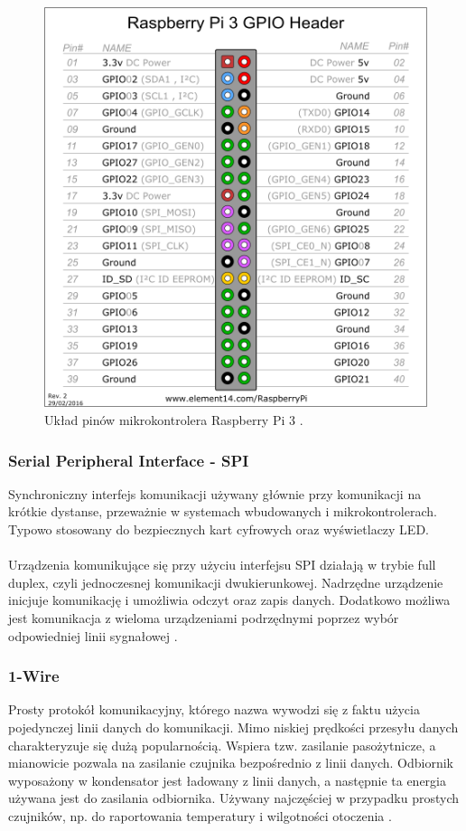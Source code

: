 \documentclass[12pt]{report}
\let\Oldsubsubsection\subsubsection
\renewcommand{\subsubsection}{\FloatBarrier\Oldsubsubsection}
\begin{document}
{\begin{figure}[h]
	\centering
	\includegraphics[width=1\textwidth]{images/pi3pinout.png}
	\caption{Układ pinów mikrokontrolera Raspberry Pi 3 \cite{pi3pinoutImg}.}
	\label{fig:pinout}
\end{figure}

\subsubsection{Serial Peripheral Interface - SPI}
Synchroniczny interfejs komunikacji używany głównie przy komunikacji na krótkie dystanse, przeważnie w systemach wbudowanych i mikrokontrolerach. Typowo stosowany do bezpiecznych kart cyfrowych oraz wyświetlaczy LED. \\ \\
Urządzenia komunikujące się przy użyciu interfejsu SPI działają w trybie full duplex, czyli jednoczesnej komunikacji dwukierunkowej. Nadrzędne urządzenie inicjuje komunikację i umożliwia odczyt oraz zapis danych. Dodatkowo możliwa jest komunikacja z wieloma urządzeniami podrzędnymi poprzez wybór odpowiedniej linii sygnałowej \cite{raspberry}.

\subsubsection{1-Wire}
Prosty protokół komunikacyjny, którego nazwa wywodzi się z faktu użycia pojedynczej linii danych do komunikacji. Mimo niskiej prędkości przesyłu danych charakteryzuje się dużą popularnością. Wspiera tzw. zasilanie pasożytnicze, a mianowicie pozwala na zasilanie czujnika bezpośrednio z linii danych. Odbiornik wyposażony w kondensator jest ładowany z linii danych, a następnie ta energia używana jest do zasilania odbiornika. Używany najczęściej w przypadku prostych czujników, np. do raportowania temperatury i wilgotności otoczenia \cite{raspberry}.

}
\end{document}
